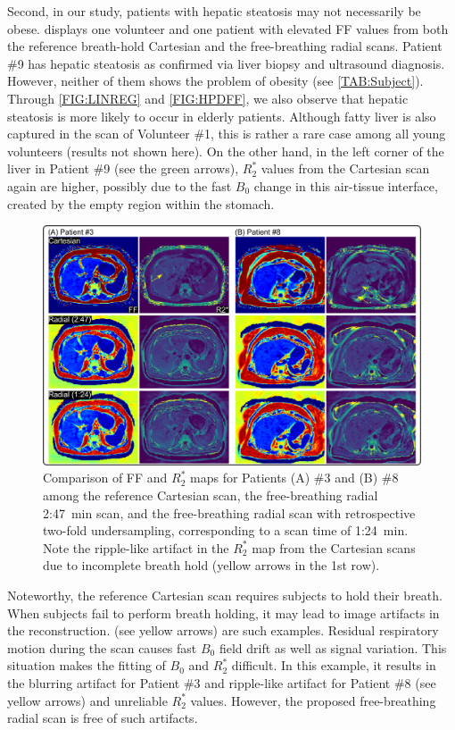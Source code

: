\documentclass[journal,twoside,web]{ieeecolor}
\begin{document}
Second, in our study, patients with hepatic steatosis may not necessarily be obese. 
 displays one volunteer and one patient with elevated FF values from 
both the reference breath-hold Cartesian and the free-breathing radial 
scans. Patient \#9 has hepatic steatosis as confirmed via %
liver biopsy and ultrasound diagnosis. 
However, neither of them shows the problem of obesity (see \cref{TAB:Subject}). 
Through \cref{FIG:LINREG} and \cref{FIG:HPDFF}, 
we also observe that hepatic steatosis is more likely to occur in elderly patients. 
Although fatty liver is also captured in the scan of Volunteer \#1, 
this is rather a rare case among all young volunteers (results not shown here). 
On the other hand, in the left corner of the liver in Patient \#9 
(see the green arrows), 
$R_2^*$ values from the Cartesian scan again are higher, 
possibly due to the fast $B_0$ change in this air-tissue interface, 
created by the empty region within the stomach.


\begin{figure}
	\centering
	\includegraphics[width=\textwidth]{../../figures/tan11.pdf}
	\caption{Comparison of FF and $R_2^*$ maps for Patients (A) \#3 and (B) \#8 
		among the reference Cartesian scan, 
		the free-breathing radial 2:47~min scan, 
		and the free-breathing radial scan with retrospective two-fold undersampling,
		corresponding to a scan time of 1:24~\si{\minute}.
		Note the ripple-like artifact in the $R_2^*$ map from the Cartesian scans 
		due to incomplete breath hold (yellow arrows in the 1st row).}
	\label{FIG:R2STAR}
\end{figure}

Noteworthy, the reference Cartesian scan requires subjects to hold their breath. 
When subjects fail to perform breath holding, 
it may lead to image artifacts in the reconstruction. 
 (see yellow arrows) are such examples. 
Residual respiratory motion during the scan 
causes fast $B_0$ field drift \cite{tan_2019_mobawf} 
as well as signal variation. 
This situation makes the fitting of $B_0$ and $R_2^*$ difficult. 
In this example, it results in the blurring artifact for Patient \#3 
and ripple-like artifact for Patient \#8 (see yellow arrows) 
and unreliable $R_2^*$ values. 
However, the proposed free-breathing radial scan is free of such artifacts.
\end{document}
